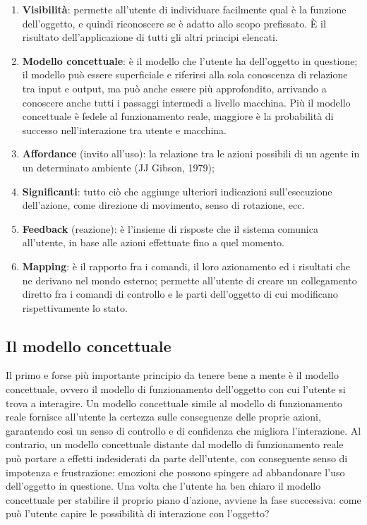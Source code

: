 \documentclass[11pt,a4paper]{article}
\begin{document}
\begin{enumerate}
	\item \textbf{Visibilità}: permette all’utente di individuare facilmente qual è la 	funzione dell’oggetto, e quindi riconoscere se è adatto allo scopo prefissato. È il risultato dell’applicazione di tutti gli altri principi elencati.
	\item \textbf{Modello concettuale}: è il modello che l’utente ha dell’oggetto in questione; il modello può essere superficiale e riferirsi alla sola conoscenza di relazione tra input e output, ma può anche essere più approfondito, arrivando a conoscere anche tutti i passaggi intermedi a livello macchina. Più il modello concettuale è fedele al funzionamento reale, maggiore è la probabilità di successo nell’interazione tra utente e macchina.
	\item \textbf{Affordance} (invito all’uso): la relazione tra le azioni possibili di un agente in un determinato ambiente (JJ Gibson, 1979);
	\item \textbf{Significanti}: tutto ciò che aggiunge ulteriori indicazioni sull’esecuzione dell’azione, come direzione di movimento, senso di rotazione, ecc.
	\item \textbf{Feedback} (reazione): è l’insieme di risposte che il sistema comunica all’utente, in base alle azioni effettuate fino a quel momento.
	\item \textbf{Mapping}: è il rapporto fra i comandi, il loro azionamento ed i risultati che ne derivano nel mondo esterno; permette all’utente di creare un collegamento diretto fra i comandi di controllo e le parti dell’oggetto di cui modificano rispettivamente lo stato.
\end{enumerate}
\subsection{Il modello concettuale}
Il primo e forse più importante principio da tenere bene a mente è il modello concettuale, ovvero il modello di funzionamento dell’oggetto con cui l’utente si trova a interagire.
Un modello concettuale simile al modello di funzionamento reale fornisce all’utente la certezza sulle conseguenze delle proprie azioni, garantendo così un senso di controllo e di confidenza che migliora l’interazione. 
Al contrario, un modello concettuale distante dal modello di funzionamento reale può portare a effetti indesiderati da parte dell’utente, con conseguente senso di impotenza e frustrazione: emozioni che possono spingere ad abbandonare l’uso dell’oggetto in questione.
Una volta che l’utente ha ben chiaro il modello concettuale per stabilire il proprio piano d’azione, avviene la fase successiva: come può l’utente capire le possibilità di interazione con l’oggetto?
\end{document}

